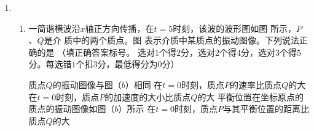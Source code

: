 \begin{enumerate}
\begin{enumerate}


	
\end{enumerate}


\item 
{}
\begin{enumerate}
	\item
一简谐横波沿$ x $轴正方向传播，在$ t=5 $时刻，该波的波形图如图  所示，$ P $、$ Q $是介
质中的两个质点。图  表示介质中某质点的振动图像。下列说法正确的是 \underlinegap （填正确答案标号。
选对$ 1 $个得$ 2 $分，选对$ 2 $个得$ 4 $分，选对$ 3 $个得$ 5 $分。每选错$ 1 $个扣$ 3 $分，最低得分为$ 0 $分）
\begin{figure}[h!]
	\centering
\begin{subfigure}{0.4\linewidth}
	\centering
	 
	\caption{}\label{2019全国134a}
\end{subfigure}
\begin{subfigure}{0.4\linewidth}
	\centering
	 
	\caption{}\label{2019全国134b}
\end{subfigure}
\end{figure}

\fivechoices
{质点$ Q $的振动图像与图（$ b $）相同}
{在$ t=0 $时刻，质点$ P $的速率比质点$ Q $的大}
{在$ t=0 $时刻，质点$ P $的加速度的大小比质点$ Q $的大}
{平衡位置在坐标原点的质点的振动图像如图（$ b $）所示}
{在$ t=0 $时刻，质点$ P $与其平衡位置的距离比质点$ Q $的大}





\end{enumerate}
\end{enumerate}
